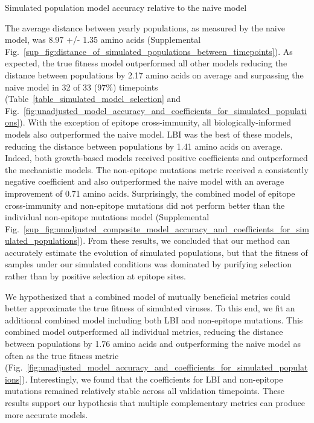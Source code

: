 \begin{table}[ht]
  \begin{center}
    
    \caption{Simulated population model accuracy relative to the naive model}
    \label{table_simulated_model_selection}
  \end{center}
\end{table}

The average distance between yearly populations, as measured by the naive model, was 8.97 +/- 1.35 amino acids (Supplemental Fig.~\ref{sup_fig:distance_of_simulated_populations_between_timepoints}).
As expected, the true fitness model outperformed all other models reducing the distance between populations by 2.17 amino acids on average and surpassing the naive model in 32 of 33 (97\%) timepoints (Table~\ref{table_simulated_model_selection} and Fig.~\ref{fig:unadjusted_model_accuracy_and_coefficients_for_simulated_populations}).
With the exception of epitope cross-immunity, all biologically-informed models also outperformed the naive model.
LBI was the best of these models, reducing the distance between populations by 1.41 amino acids on average.
Indeed, both growth-based models received positive coefficients and outperformed the mechanistic models.
The non-epitope mutations metric received a consistently negative coefficient and also outperformed the naive model with an average improvement of 0.71 amino acids.
Surprisingly, the combined model of epitope cross-immunity and non-epitope mutations did not perform better than the individual non-epitope mutations model (Supplemental Fig.~\ref{sup_fig:unadjusted_composite_model_accuracy_and_coefficients_for_simulated_populations}).
From these results, we concluded that our method can accurately estimate the evolution of simulated populations, but that the fitness of samples under our simulated conditions was dominated by purifying selection rather than by positive selection at epitope sites.

We hypothesized that a combined model of mutually beneficial metrics could better approximate the true fitness of simulated viruses.
To this end, we fit an additional combined model including both LBI and non-epitope mutations.
This combined model outperformed all individual metrics, reducing the distance between populations by 1.76 amino acids and outperforming the naive model as often as the true fitness metric (Fig.~\ref{fig:unadjusted_model_accuracy_and_coefficients_for_simulated_populations}).
Interestingly, we found that the coefficients for LBI and non-epitope mutations remained relatively stable across all validation timepoints.
These results support our hypothesis that multiple complementary metrics can produce more accurate models.

